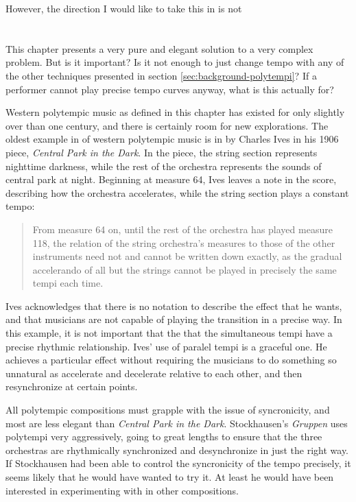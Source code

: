 However, the direction I would like to take this in is not 

\section{\polytempic}
This chapter presents a very pure and elegant solution to a very
complex problem. But is it important? Is it not enough to just change
tempo with any of the other techniques presented in section
\ref{sec:background-polytempi}? If a performer cannot play precise tempo
curves anyway, what is this actually for?

Western polytempic music as defined in this chapter has existed for
only slightly over than one century, and there is certainly room for
new explorations. The oldest example in of western polytempic music is
in by Charles Ives in his 1906 piece, \textit{Central Park in the
  Dark}.\cite{Greschak2003} In the piece, the string section
represents nighttime darkness, while the rest of the orchestra
represents the sounds of central park at night. Beginning at measure
64, Ives leaves a note in the score, describing how the orchestra
accelerates, while the string section plays a constant tempo:
\begin{quotation}
  From measure 64 on, until the rest of the orchestra has played
  measure 118, the relation of the string orchestra's measures to
  those of the other instruments need not and cannot be written down
  exactly, as the gradual accelerando of all but the strings cannot be
  played in precisely the same tempi each time.
\end{quotation}
Ives acknowledges that there is no notation to describe the effect
that he wants, and that musicians are not capable of playing the
transition in a precise way. In this example, it is not important that
the that the simultaneous tempi have a precise rhythmic
relationship. Ives' use of paralel tempi is a graceful one. He
achieves a particular effect without requiring the musicians to do
something so unnatural as accelerate and decelerate relative to each
other, and then resynchronize at certain points. 

All polytempic compositions must grapple with the issue of
syncronicity, and most are less elegant than \textit{Central Park in
  the Dark}. Stockhausen's \textit{Gruppen} uses polytempi very
aggressively, going to great lengths to ensure that the three
orchestras are rhythmically synchronized and desynchronize in just the
right way.  If Stockhausen had been able to control the syncronicity
of the tempo precisely, it seems likely that he would have wanted
to try it. At least he would have been interested in experimenting with
\polytempic in other compositions.

